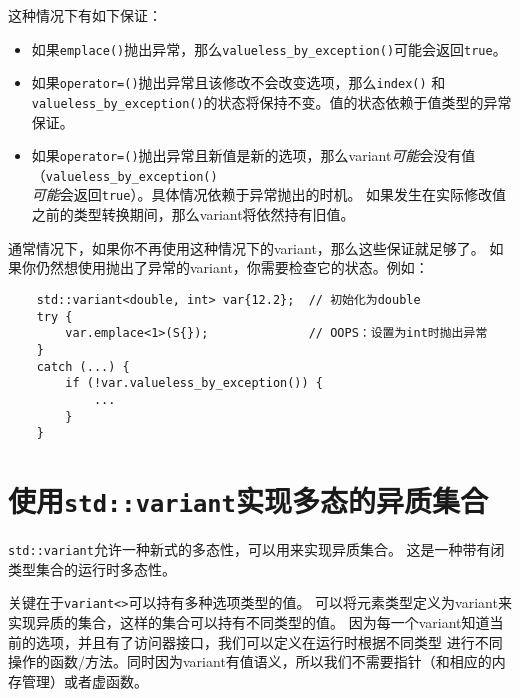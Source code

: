 这种情况下有如下保证：
\begin{itemize}
    \item 如果\texttt{emplace()}抛出异常，那么\texttt{valueless\_by\_exception()}可能会返回\texttt{true}。
    \item 如果\texttt{operator=()}抛出异常且该修改不会改变选项，那么\texttt{index()}
    和\texttt{valueless\_by\_exception()}的状态将保持不变。值的状态依赖于值类型的异常保证。
    \item 如果\texttt{operator=()}抛出异常且新值是新的选项，那么variant\emph{可能}会没有值
    （\texttt{valueless\_by\_exception()}\\
    \emph{可能}会返回\texttt{true}）。具体情况依赖于异常抛出的时机。
    如果发生在实际修改值之前的类型转换期间，那么variant将依然持有旧值。
\end{itemize}
通常情况下，如果你不再使用这种情况下的variant，那么这些保证就足够了。
如果你仍然想使用抛出了异常的variant，你需要检查它的状态。例如：
\begin{lstlisting}
    std::variant<double, int> var{12.2};  // 初始化为double
    try {
        var.emplace<1>(S{});              // OOPS：设置为int时抛出异常
    }
    catch (...) {
        if (!var.valueless_by_exception()) {
            ...
        }
    }
\end{lstlisting}


\section{使用\texttt{std::variant}实现多态的异质集合}
\texttt{std::variant}允许一种新式的多态性，可以用来实现异质集合。
这是一种带有闭类型集合的运行时多态性。

关键在于\texttt{variant<>}可以持有多种选项类型的值。
可以将元素类型定义为variant来实现异质的集合，这样的集合可以持有不同类型的值。
因为每一个variant知道当前的选项，并且有了访问器接口，我们可以定义在运行时根据不同类型
进行不同操作的函数/方法。同时因为variant有值语义，所以我们不需要指针（和相应的内存管理）或者虚函数。

